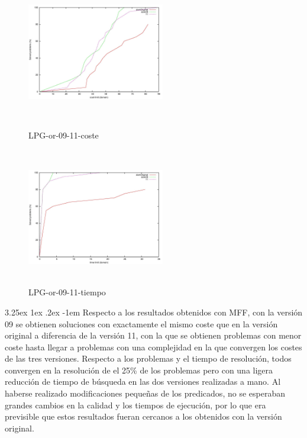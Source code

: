 \documentclass{article}
\makeatletter
\renewcommand\paragraph{\@startsection{paragraph}{5}{\z@}%
  {3.25ex \@plus1ex \@minus.2ex}%
  {-1em}%
  {\normalfont\normalsize\bfseries}}
\makeatother
\begin{document}
\begin{figure}[!htb]
   \begin{minipage}{0.48\textwidth}
     \centering
     \includegraphics[width=6cm, height=6cm]{lpg-or-09-11-cost}
    \caption{LPG-or-09-11-coste}
   \end{minipage}\hfill
   \begin {minipage}{0.48\textwidth}
     \centering
     \includegraphics[width=6cm, height=6cm]{lpg-or-09-11-time}
    \caption{LPG-or-09-11-tiempo}
   \end{minipage}
\end{figure}

\paragraph{}
Respecto a los resultados obtenidos con MFF, con la versión 09 se obtienen soluciones con exactamente el mismo coste que en la versión original a diferencia de la versión 11, con la que se obtienen problemas con menor coste hasta llegar a problemas con una complejidad en la que convergen los costes de las tres versiones. Respecto a los problemas y el tiempo de resolución, todos convergen en la resolución de el 25\% de los problemas pero con una ligera reducción de tiempo de búsqueda en las dos versiones realizadas a mano. Al haberse realizado modificaciones pequeñas de los predicados, no se esperaban grandes cambios en la calidad y los tiempos de ejecución, por lo que era previsible que estos resultados fueran cercanos a los obtenidos con la versión original.
\end{document}
